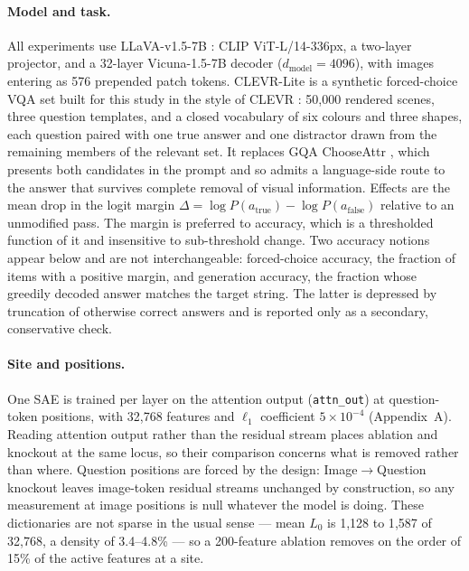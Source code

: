 \documentclass[11pt,a4paper]{article}
\begin{document}
\paragraph{Model and task.} All experiments use LLaVA-v1.5-7B
\citep{liu2023llava}: CLIP ViT-L/14-336px, a two-layer projector, and a 32-layer
Vicuna-1.5-7B decoder ($d_{\text{model}} = 4096$), with images entering as 576
prepended patch tokens. CLEVR-Lite is a synthetic forced-choice VQA set built
for this study in the style of CLEVR \citep{johnson2017clevr}: 50{,}000 rendered
scenes, three question templates, and a closed vocabulary of six colours and
three shapes, each question paired with one true answer and one distractor drawn
from the remaining members of the relevant set. It replaces GQA ChooseAttr
\citep{hudson2019gqa}, which presents both candidates in the prompt and so
admits a language-side route to the answer that survives complete removal of
visual information. Effects are the mean drop in the logit margin
$\Delta = \log P(a_{\text{true}}) - \log P(a_{\text{false}})$ relative to an
unmodified pass. The margin is preferred to accuracy, which is a thresholded
function of it and insensitive to sub-threshold change. Two accuracy notions
appear below and are not interchangeable: forced-choice accuracy, the fraction
of items with a positive margin, and generation accuracy, the fraction whose
greedily decoded answer matches the target string. The latter is depressed by
truncation of otherwise correct answers and is reported only as a secondary,
conservative check.

\paragraph{Site and positions.} One SAE is trained per layer on the attention
output (\texttt{attn\_out}) at question-token positions, with 32{,}768 features
and $\ell_1$ coefficient $5\times10^{-4}$ (Appendix~A). Reading attention output
rather than the residual stream places ablation and knockout at the same locus,
so their comparison concerns what is removed rather than where. Question
positions are forced by the design: Image$\rightarrow$Question knockout leaves
image-token residual streams unchanged by construction, so any measurement at
image positions is null whatever the model is doing. These dictionaries are not
sparse in the usual sense --- mean $L_0$ is 1{,}128 to 1{,}587 of 32{,}768, a
density of 3.4--4.8\% --- so a 200-feature ablation removes on the order of 15\%
of the active features at a site.
\end{document}
